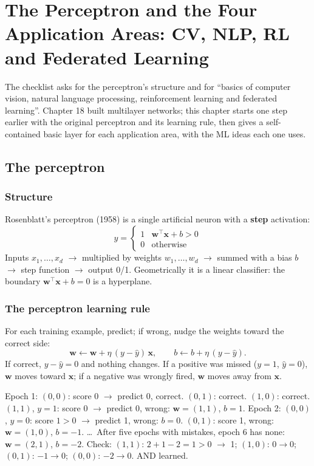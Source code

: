 \chapter{The Perceptron and the Four Application Areas: CV, NLP, RL and Federated Learning}

The checklist asks for the perceptron's structure and for ``basics of computer vision, natural language processing, reinforcement learning and federated
learning''. Chapter 18 built multilayer networks; this chapter starts one step earlier with the original perceptron and its learning rule, then gives a
self-contained basic layer for each application area, with the ML ideas each one uses.

\section{The perceptron}
\subsection{Structure}
Rosenblatt's perceptron (1958) is a single artificial neuron with a \textbf{step} activation:
\[ \hat y = \begin{cases}1 & \mathbf w^\top\mathbf x + b > 0\\ 0 & \text{otherwise}\end{cases} \]
Inputs $x_1,\dots,x_d$ $\to$ multiplied by weights $w_1,\dots,w_d$ $\to$ summed with a bias $b$ $\to$ step function $\to$ output 0/1. Geometrically it is a linear
classifier: the boundary $\mathbf w^\top\mathbf x + b = 0$ is a hyperplane.

\subsection{The perceptron learning rule}
For each training example, predict; if wrong, nudge the weights toward the correct side:
\[ \mathbf w\leftarrow\mathbf w + \eta\,(y - \hat y)\,\mathbf x,\qquad b\leftarrow b + \eta\,(y - \hat y). \]
If correct, $y - \hat y = 0$ and nothing changes. If a positive was missed ($y = 1$, $\hat y = 0$), $\mathbf w$ moves toward $\mathbf x$; if a negative was wrongly fired, $\mathbf w$
moves away from $\mathbf x$.
\begin{example}[: learning the AND gate by hand ($\eta = 1$, start $\mathbf w = (0, 0)$, $b = 0$)]
Epoch 1: $(0,0)$: score 0 $\to$ predict 0, correct. $(0,1)$: correct. $(1,0)$: correct. $(1,1)$, $y = 1$: score 0 $\to$ predict 0, wrong: $\mathbf w = (1,1)$, $b = 1$.
Epoch 2: $(0,0)$, $y = 0$: score $1 > 0$ $\to$ predict 1, wrong: $b = 0$. $(0,1)$: score 1, wrong: $\mathbf w = (1, 0)$, $b = -1$. \dots\
After five epochs with mistakes, epoch 6 has none: $\mathbf w = (2, 1)$, $b = -2$. Check: $(1,1)$: $2 + 1 - 2 = 1 > 0$ $\to$ 1; $(1,0)$: $0\to0$; $(0,1)$: $-1\to0$;
$(0,0)$: $-2\to0$. AND learned.
\end{example}

